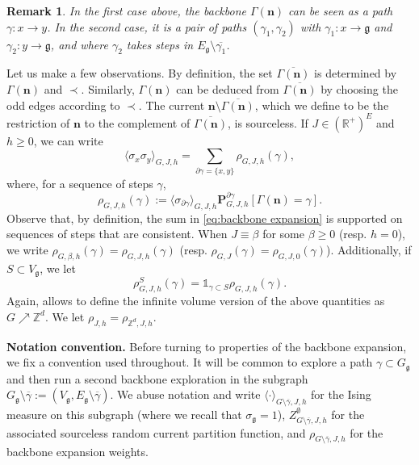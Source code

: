 \documentclass[10pt,a4paper]{amsart}
\numberwithin{equation}{section}
\newtheorem{Rem}[Thm]{Remark}
\newcommand\n{\mathbf{n}}
\newcommand\fg{\mathfrak{g}}
\begin{document}
\begin{Rem}\label{rem:writing with paths}
In the first case above, the backbone $\Gamma(\n)$ can be seen as a path $\gamma:x\rightarrow y$. In the second case, it is a pair of paths $(\gamma_1,\gamma_2)$ with $\gamma_1:x\rightarrow \fg$ and $\gamma_2:y\rightarrow \fg$, and where $\gamma_2$ takes steps in $E_\fg\setminus \overline{\gamma_1}$.
\end{Rem}	
Let us make a few observations. By definition, the set $\overline{\Gamma(\n)}$ is determined by $\Gamma(\n)$ and $\prec$. Similarly, $\Gamma(\n)$ can be deduced from $\overline{\Gamma(\n)}$ by choosing the odd edges according to $\prec$. The current $\n\setminus\overline{\Gamma(\n)}$, which we define to be the restriction of $\n$ to the complement of $\overline{\Gamma(\n)}$, is sourceless. If $J\in (\mathbb R^+)^E$ and $h\geq 0$, we can write
\begin{equation}\label{eq:backbone expansion}
	\langle \sigma_x\sigma_y\rangle_{G,J,h}=\sum_{\partial \gamma=\{x,y\}}\rho_{G,J,h}(\gamma),
\end{equation}
where, for a sequence of steps $\gamma$,\begin{equation}
	\rho_{G,J,h}(\gamma):=\langle \sigma_{\partial \gamma}\rangle_{G,J,h}\mathbf P^{\partial \gamma}_{G,J,h}[\Gamma(\n)=\gamma].
\end{equation}
Observe that, by definition, the sum in \eqref{eq:backbone expansion} is supported on sequences of steps that are consistent. 
When $J\equiv \beta$ for some $\beta\geq 0$ (resp. $h=0$), we write $\rho_{G,\beta,h}(\gamma)=\rho_{G,J,h}(\gamma)$ (resp. $\rho_{G,J}(\gamma)=\rho_{G,J,0}(\gamma)$). Additionally, if $S\subset V_\fg$, we let 
\begin{equation}\label{eq:def rho S}
\rho_{G,J,h}^S(\gamma)=\mathds{1}_{\gamma\subset S}\rho_{G,J,h}(\gamma).
\end{equation}
 Again, \cite{AizenmanDuminilSidoraviciusContinuityIsing2015} allows to define the infinite volume version of the above quantities as $G\nearrow \mathbb Z^d$. We let $\rho_{J,h}=\rho_{\mathbb Z^d,J,h}$.
 
 \vspace{5pt}
 \noindent \textbf{Notation convention.} Before turning to properties of the backbone expansion, we fix a convention used 
throughout. It will be common to explore a path $\gamma\subset G_\fg$ and then run 
a second backbone exploration in the subgraph $G_\fg\setminus\overline{\gamma} 
:= (V_\fg, E_\fg\setminus\overline{\gamma})$. We abuse notation and write 
$\langle\cdot\rangle_{G\setminus\overline{\gamma},J,h}$ for the Ising measure 
on this subgraph (where we recall that $\sigma_\fg=1$), $Z^\emptyset_{G\setminus\overline{\gamma},J,h}$ for the 
associated sourceless random current partition function, and 
$\rho_{G\setminus\overline{\gamma},J,h}$ for the backbone expansion weights. 
 \vspace{5pt}
\end{document}
